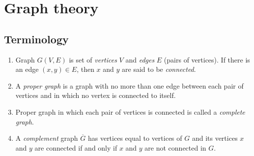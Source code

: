 \documentclass{article}
\begin{document}
\section*{Graph theory}
\subsection*{Terminology}
\begin{enumerate}
	\item 
	Graph $G(V,E)$ is set of \emph{vertices} $V$ and \emph{edges} $E$ (pairs of vertices). If there is an edge $(x,y) \in E$, then $x$ and $y$ are said to be \emph{connected}.
	\item 
	A \emph{proper graph} is a graph with no more than one edge between each pair of vertices and in which no vertex is connected to itself.
	\item 
	Proper graph in which each pair of vertices is connected is called a \emph{complete graph}.
	\item
	A \emph{complement} graph $\overline{G}$ has vertices equal to vertices of $G$ and its vertices $x$ and $y$ are connected if and only if $x$ and $y$ are not connected in $G$.
	

\end{enumerate}
\end{document}
